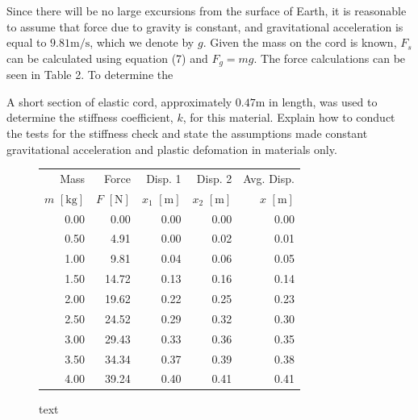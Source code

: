 \documentclass[a4paper]{article}
\begin{document}
Since there will be no large excursions from the surface of Earth, it is reasonable to assume that force due to gravity is constant, and gravitational acceleration is equal to $9.81\si{\meter\per\second}$, which we denote by $g$. Given the mass on the cord is known, $F_s$ can be calculated using equation (7) and $F_g = mg$. The force calculations can be seen in Table 2. To determine the 

A short section of elastic cord, approximately $0.47\si{\meter}$ in length, was used to determine the stiffness coefficient, $k$, for this material.
Explain how to conduct the tests for the stiffness check and state the assumptions made constant gravitational acceleration and plastic defomation in materials only.

\begin{figure}[h]
	\begin{minipage}{0.45\textwidth}
		\centering
		\caption{text}
	\end{minipage}
	\begin{minipage}{0.45\textwidth}
		\centering
		\begin{tabular}{rrrrr}
			\toprule
			Mass & Force & Disp.  1 & Disp.  2 & Avg. Disp. \\
			$m$ $[\si{\kilogram}]$ & $F$ $[\si{\newton}]$ & $x_1$ $[\si{\meter}]$ & $x_2$ $[\si{\meter}]$ & $x$ $[\si{\meter}]$ \\
			\midrule
			0.00 &  0.00 & 0.00 & 0.00 & 0.00\\
			0.50 &  4.91 & 0.00 & 0.02 & 0.01\\
			1.00 &  9.81 & 0.04 & 0.06 & 0.05\\
			1.50 & 14.72 & 0.13 & 0.16 & 0.14\\
			2.00 & 19.62 & 0.22 & 0.25 & 0.23\\
			2.50 & 24.52 & 0.29 & 0.32 & 0.30\\
			3.00 & 29.43 & 0.33 & 0.36 & 0.35\\
			3.50 & 34.34 & 0.37 & 0.39 & 0.38\\
			4.00 & 39.24 & 0.40 & 0.41 & 0.41\\
			\bottomrule
		\end{tabular}
	\end{minipage}
\end{figure}
\end{document}
